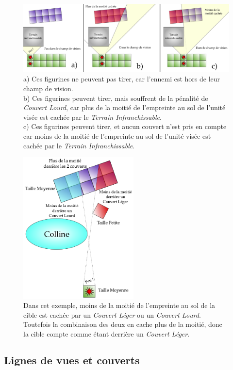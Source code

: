 \begin{figure}[!htbp]
\centering
\includegraphics[width=15.5cm]{couvert_lourd.png}
\caption{a) Ces figurines ne peuvent pas tirer, car l'ennemi est hors de leur champ de vision. \\
b) Ces figurines peuvent tirer, mais souffrent de la pénalité de \emph{Couvert Lourd}, car plus de la moitié de l'empreinte au sol de l'unité visée est cachée par le \emph{Terrain Infranchissable}. \\
c) Ces figurines peuvent tirer, et aucun couvert n'est pris en compte car moins de la moitié de l'empreinte au sol de l'unité visée est cachée par le \emph{Terrain Infranchissable}.}
\label{figure/couvert_lourd}
\end{figure}

\newpage

\begin{figure}[!htbp]
\centering
\includegraphics[width=6cm]{couvert_leger_et_lourd.png}
\caption{Dans cet exemple, moins de la moitié de l'empreinte au sol de la cible est cachée par un \emph{Couvert Léger} ou un \emph{Couvert Lourd}. Toutefois la combinaison des deux en cache plus de la moitié, donc la cible compte comme étant derrière un \emph{Couvert Léger}.}
\label{figure/couvert_leger_et_lourd}
\end{figure}

\subsection{Lignes de vues et couverts}

